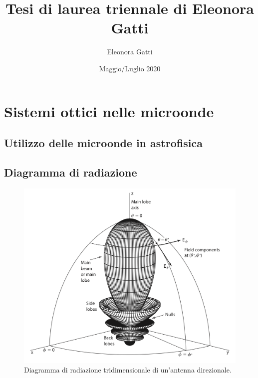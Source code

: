\documentclass[12pt,a4paper,final]{book}
\title{Tesi di laurea triennale di Eleonora Gatti}
\author{Eleonora Gatti}
\date{Maggio/Luglio 2020}
\begin{document}


\newpage
\thispagestyle{empty}
\clearpage\mbox{}\clearpage
\newpage
\thispagestyle{empty}


\tableofcontents
\newpage


\chapter{Sistemi ottici nelle microonde}\label{intro_sistemi_ottici}


\section{Utilizzo delle microonde in astrofisica}\label{microonde_astrofisica}


\section{Diagramma di radiazione}\label{rad_pattern}

\begin{figure}[!ht]
	\centering
	\includegraphics[width=0.8\linewidth]{../figures/diag_rad.png}
	\caption{Diagramma di radiazione tridimensionale di un'antenna direzionale.\cite{cmb}}
	\label{diag_rad}
\end{figure}
\end{document}
